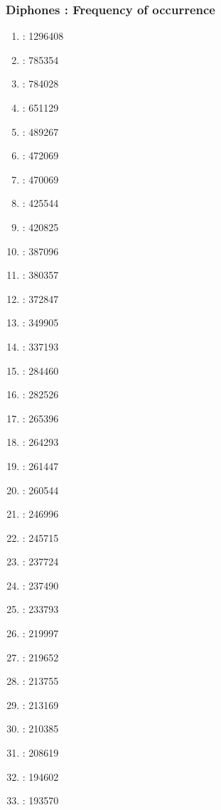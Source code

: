 \documentclass[notes]{beamer}
\begin{document}
\frame
{
  \frametitle{Diphones : Frequency of occurrence}

\begin{tiny}
\begin{multicols}{4}
\begin{enumerate}
    \item {} : 1296408
    \item {} : 785354
    \item {} : 784028
    \item {} : 651129
    \item {} : 489267
    \item {} : 472069
    \item {} : 470069
    \item {} : 425544
    \item {} : 420825
    \item {} : 387096
    \item {} : 380357
    \item {} : 372847
    \item {} : 349905
    \item {} : 337193
    \item {} : 284460
    \item {} : 282526
    \item {} : 265396
    \item {} : 264293
    \item {} : 261447
    \item {} : 260544
    \item {} : 246996
    \item {} : 245715
    \item {} : 237724
    \item {} : 237490
    \item {} : 233793
    \item {} : 219997
    \item {} : 219652
    \item {} : 213755
    \item {} : 213169
    \item {} : 210385
    \item {} : 208619
    \item {} : 194602
    \item {} : 193570

\end{enumerate}
\end{multicols}
\end{tiny}}
\end{document}

